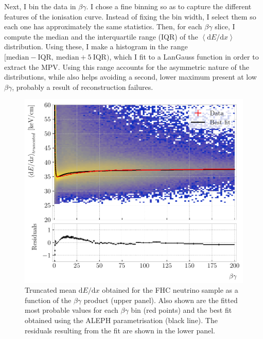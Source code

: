 Next, I bin the data in $\beta\gamma$. I chose a fine binning so as to capture the different features of the ionisation curve. Instead of fixing the bin width, I select them so each one has approximately the same statistics. Then, for each $\beta\gamma$ slice, I compute the median and the interquartile range (IQR) of the $\left<\mathrm{d}E/\mathrm{d}x\right>$ distribution. Using these, I make a histogram in the range $[\mathrm{median}-\mathrm{IQR},~ \mathrm{median}+5~\mathrm{IQR})$, which I fit to a LanGauss function in order to extract the MPV. Using this range accounts for the asymmetric nature of the distributions, while also helps avoiding a second, lower maximum present at low $\beta\gamma$, probably a result of reconstruction failures.

\begin{figure}[t]
	\centering
	\includegraphics[width=.85\linewidth]{Images/GArSoft_PID/dEdx/dEdx_aleph_data_with_fit.pdf}
	\caption[Truncated mean $\mathrm{d}E/\mathrm{d}x$ obtained for the FHC neutrino sample as a function of the $\beta\gamma$ product, together with the fitted most probable values for each $\beta\gamma$ bin and the best fit obtained using the ALEPH parametrisation.]{Truncated mean $\mathrm{d}E/\mathrm{d}x$ obtained for the FHC neutrino sample as a function of the $\beta\gamma$ product (upper panel). Also shown are the fitted most probable values for each $\beta\gamma$ bin (red points) and the best fit obtained using the ALEPH parametrisation (black line). The residuals resulting from the fit are shown in the lower panel.}
	\label{fig:dEdx_betagamma_ALEPH}
\end{figure}

